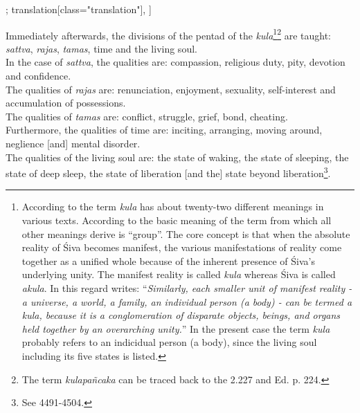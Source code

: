 \begin{alignment}[
  texts=edition[class="edition"];
  translation[class="translation"],
  ]
\begin{translation}
\begin{tlate}[p51_01]
 Immediately afterwards, the divisions of the pentad of the \textit{kula}\footnote{According to \citeauthor[1963:594-597]{pandey1963} the term \textit{kula} has about twenty-two different meanings in various texts. According to \citeauthor{triadicheart} the basic meaning of the term from which all other meanings derive is ``group''. The core concept is that when the absolute reality of Śiva becomes manifest, the various manifestations of reality come together as a unified whole because of the inherent presence of Śiva's underlying unity. The manifest reality is called \textit{kula} whereas Śiva is called \textit{akula}. In this regard \citeauthor[1989:59]{triadicheart} writes: ``\textit{Similarly, each smaller unit of manifest reality - a universe, a world, a family, an individual person (a body) - can be termed a \textit{kula}, because it is a conglomeration of disparate objects, beings, and organs held together by an overarching unity.}'' In the present case the term \textit{kula} probably refers to an indicidual person (a body), since the living soul including its five states is listed.}\footnote{The term \textit{kulapañcaka} can be traced back to the  2.227 and  Ed. p. 224.} are taught: \textit{sattva}, \textit{rajas}, \textit{tamas}, time and the living soul.\\

In the case of \textit{sattva}, the qualities are: compassion, religious duty, pity, devotion and confidence.\\

The qualities of \textit{rajas} are: renunciation, enjoyment, sexuality, self-interest and accumulation of possessions.\\

The qualities of \textit{tamas} are: conflict, struggle, grief, bond, cheating.\\

Furthermore, the qualities of time are: inciting, arranging, moving around, neglience [and] mental disorder.\\

The qualities of the living soul are: the state of waking, the state of sleeping, the state of deep sleep, the state of liberation [and the] state beyond liberation\footnote{See  4491-4504.}.\\

\flushpage
    \end{tlate}
  \end{translation} 
\end{alignment}
